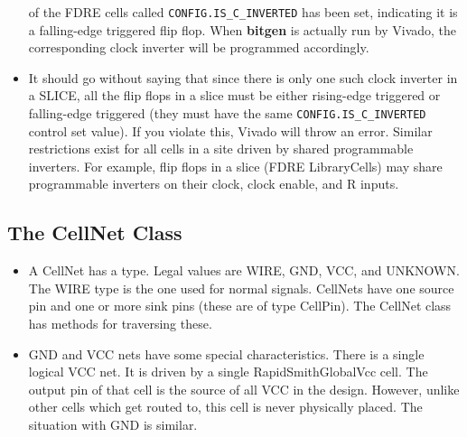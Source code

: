 \documentclass[12pt]{article}
\newcommand{\env}[1]{{\texttt{#1}}}
\newcommand{\pgm}[1]{{\textbf{#1}}}
\begin{document}
\begin{itemize}
  of the FDRE cells called \env{CONFIG.IS\_C\_INVERTED} has been set, indicating
  it is a falling-edge triggered flip flop.  When \pgm{bitgen} is actually run
  by Vivado, the corresponding clock inverter will be programmed accordingly.
  \item It should go without saying that since there is only one such clock
  inverter in a SLICE, all the flip flops in a slice must be either rising-edge
  triggered or falling-edge triggered (they must have the same
  \env{CONFIG.IS\_C\_INVERTED} control set value).  If you violate this, Vivado
  will throw an error.  Similar restrictions exist for all cells in a site driven by
  shared programmable inverters.  For example, flip flops in a slice (FDRE
  LibraryCells) may share programmable inverters on their clock, clock enable,
  and R inputs.
\end{itemize}

\subsection{The CellNet Class}
\begin{itemize}
  \item	A CellNet has a type.  Legal values are WIRE, GND, VCC, and UNKNOWN. 
  The WIRE type is the one used for normal signals.  CellNets have one source
  pin and one or more sink pins (these are of type CellPin).  The CellNet class
  has methods for traversing these.
  \item	GND and VCC nets have some special characteristics. There is a single
  logical VCC net.  It is driven by a single RapidSmithGlobalVcc cell.  The
  output pin of that cell is the source of all VCC in the design. However,
  unlike other cells which get routed to, this cell is never physically placed. 
  The situation with GND is similar.
\end{itemize}
\end{document}

